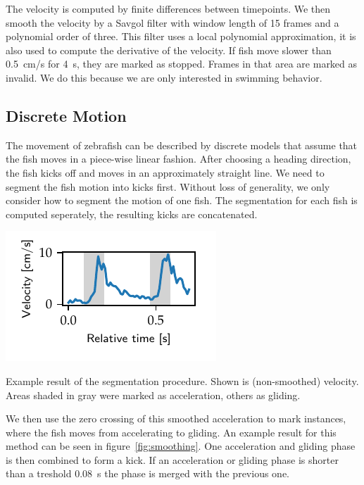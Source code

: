 \documentclass[nobib]{tufte-handout}
\begin{document}
The velocity is computed by finite differences between timepoints.
We then smooth the velocity by a Savgol filter with window length of 15 frames and a polynomial order of three.
This filter uses a local polynomial approximation, it is also used to compute the derivative of the velocity.
If fish move slower than \SI{0.5}{\cm/\s} for \SI{4}{\s}, they are marked as stopped.
Frames in that area are marked as invalid.
We do this because we are only interested in swimming behavior.

\subsection{Discrete Motion}
The movement of zebrafish can be described by discrete models that assume that the fish moves in a piece-wise linear fashion.
After choosing a heading direction, the fish kicks off and moves in an approximately straight line.
We need to segment the fish motion into kicks first.
Without loss of generality, we only consider how to segment the motion of one fish.
The segmentation for each fish is computed seperately, the resulting kicks are concatenated.

\begin{marginfigure}
\includegraphics[scale=1]{smoothing}
\caption{Example result of the segmentation procedure.
  Shown is (non-smoothed) velocity.
  Areas shaded in gray were marked as acceleration, others as gliding.
\label{fig:smoothing}}
\end{marginfigure}
We then use the zero crossing of this smoothed acceleration to mark instances, where the fish moves from accelerating to gliding.
An example result for this method can be seen in figure~\ref{fig:smoothing}.
One acceleration and gliding phase is then combined to form a kick.
If an acceleration or gliding phase is shorter than a treshold \SI{0.08}{\s} the phase is merged with the previous one.
\end{document}
